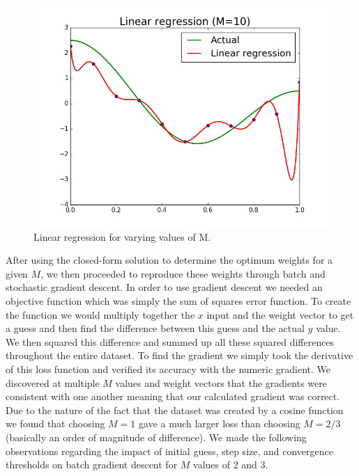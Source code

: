 \documentclass{article}
\begin{document}
\begin{figure}[width=\linewidth]
\begin{multicols}{2}
  \includegraphics[width=1.2\linewidth]{code/P2/linear_regression,10.png}
\end{multicols}
\caption{Linear regression for varying values of M.}
\end{figure}

After using the closed-form solution to determine the optimum weights for a given $M$, we then proceeded to reproduce these weights through batch and stochastic gradient descent. In order to use gradient descent we needed an objective function which was simply the sum of squares error function. To create the function we would multiply together the $x$ input and the weight vector to get a guess and then find the difference between this guess and the actual $y$ value. We then squared this difference and summed up all these squared differences throughout the entire dataset. To find the gradient we simply took the derivative of this loss function and verified its accuracy with the numeric gradient. We discovered at multiple $M$ values and weight vectors that the gradients were consistent with one another meaning that our calculated gradient was correct. Due to the nature of the fact that the dataset was created by a cosine function we found that choosing $M = 1$ gave a much larger loss than choosing $M = 2/3$ (basically an order of magnitude of difference). We made the following observations regarding the impact of initial guess, step size, and convergence thresholds on batch gradient descent for $M$ values of 2 and 3. \\
\end{document}
